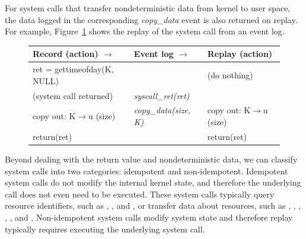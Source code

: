 For system calls that transfer nondeterministic data from kernel to
user space, the data logged in the corresponding {\em copy\_data}
event is also returned on replay.  For example,
Figure~\ref{scribe:fig:recplay} shows the replay of the  
system call from an event log.

\begin{figure}[t]
  \scriptsize
  \begin{center}
  \begin{tabular}{lll}

    \hline	

    {\bf Record (action) \hfill $\rightarrow$ }
      & {\bf Event log \hfill $\rightarrow$ }
        & {\bf Replay (action)}
            \\

    \hline	

    ret = gettimeofday(K, NULL)
      &
        & (do nothing)
            \\

    (system call returned)
      & {\em syscall\_ret(ret)}
        &
            \\

    copy out: K$\rightarrow$u (size)
      & {\em copy\_data(size, K)}
        & copy out: K$\rightarrow$u (size)
            \\

    return(ret)
      &
        & return(ret)
            \\

    \hline	

  \end{tabular}
  \end{center}

  \vskip -5mm
  \label{scribe:fig:recplay}
  \vskip -3mm
\end{figure}

Beyond dealing with the return value and nondeterministic data, we can
classify system calls into two categories: idempotent and non-idempotent.
Idempotent system calls do not modify the internal kernel state, and
therefore the underlying call does not even need to be executed. These
system calls typically query resource identifiers, such
as , ,  and , or 
transfer data about resources, such as , , 
, , ,
and .  Non-idempotent system calls modify system state
and therefore replay typically requires executing the underlying
system call. 

